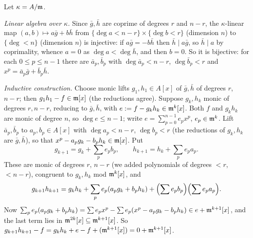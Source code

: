 \documentclass[11pt]{article}
\begin{document}
\pf
Let $\kappa=A/\mathfrak m$.

\emph{Linear algebra over $\kappa$.} Since $\bar g,\bar h$ are coprime of degrees $r$ and $n-r$, the $\kappa$-linear map $(a,b)\mapsto a\bar g+b\bar h$ from $\{\deg a<n-r\}\times\{\deg b<r\}$ (dimension $n$) to $\{\deg<n\}$ (dimension $n$) is injective: if $a\bar g=-b\bar h$ then $\bar h\mid a\bar g$, so $\bar h\mid a$ by coprimality, whence $a=0$ as $\deg a<\deg\bar h$, and then $b=0$. So it is bijective: for each $0\le p\le n-1$ there are $\bar a_p,\bar b_p$ with $\deg\bar a_p<n-r$, $\deg\bar b_p<r$ and $x^p=\bar a_p\bar g+\bar b_p\bar h$.

\emph{Inductive construction.} Choose monic lifts $g_1,h_1\in A[x]$ of $\bar g,\bar h$ of degrees $r$, $n-r$; then $g_1h_1-f\in\mathfrak m[x]$ (the reductions agree). Suppose $g_k,h_k$ monic of degrees $r,n-r$, reducing to $\bar g,\bar h$, with $e:=f-g_kh_k\in\mathfrak m^k[x]$. Both $f$ and $g_kh_k$ are monic of degree $n$, so $\deg e\le n-1$; write $e=\sum_{p=0}^{n-1}e_px^p$, $e_p\in\mathfrak m^k$. Lift $\bar a_p,\bar b_p$ to $a_p,b_p\in A[x]$ with $\deg a_p<n-r$, $\deg b_p<r$ (the reductions of $g_k,h_k$ are $\bar g,\bar h$), so that $x^p-a_pg_k-b_ph_k\in\mathfrak m[x]$. Put
\[
g_{k+1}=g_k+\sum_pe_pb_p,\qquad h_{k+1}=h_k+\sum_pe_pa_p .
\]
These are monic of degrees $r$, $n-r$ (we added polynomials of degrees $<r$, $<n-r$), congruent to $g_k,h_k$ mod $\mathfrak m^k[x]$, and
\[
g_{k+1}h_{k+1}=g_kh_k+\sum_pe_p(a_pg_k+b_ph_k)+\Bigl(\sum e_pb_p\Bigr)\Bigl(\sum e_pa_p\Bigr).
\]
Now $\sum_pe_p(a_pg_k+b_ph_k)=\sum e_px^p-\sum e_p(x^p-a_pg_k-b_ph_k)\in e+\mathfrak m^{k+1}[x]$, and the last term lies in $\mathfrak m^{2k}[x]\subseteq\mathfrak m^{k+1}[x]$. So $g_{k+1}h_{k+1}-f=g_kh_k+e-f+(\mathfrak m^{k+1}[x])=0+\mathfrak m^{k+1}[x]$.
\end{document}
